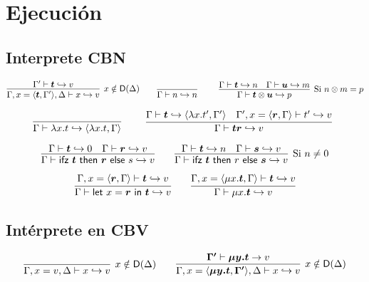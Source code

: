 \documentclass[twoside,a4paper,12pt]{article}
\theoremstyle{definition}
\theoremstyle{remark}
\begin{document}
\newpage
\section*{Ejecución}

\subsection*{Interprete CBN}

\begin{equation*}
  \infer[x\notin\mathsf D(\Delta)]
    {\Gamma,x=\thunk {\bm{t}}{\Gamma'},\Delta\vdash x\hra v}
    {\Gamma'\vdash \bm{t}\hra v}
  \qquad
  \infer[]
    {\Gamma\vdash n\hra n}
    {}
  \qquad
  \infer[\textrm{Si }n\otimes m=p]
    {\Gamma\vdash \bm{t} \otimes \bm{u} \hra p}
    {\Gamma\vdash \bm{t} \hra n & \Gamma\vdash \bm{u}\hra m }
\end{equation*}

\begin{equation*}
  \infer[]
    {\Gamma\vdash\fun xt\hra\thunk {\fun xt}\Gamma}
    {}
  \qquad
  \infer[]
    {\Gamma\vdash \bm{t} \bm{r} \hra v}
    {
      \Gamma\vdash \bm{t} \hra \thunk{\fun x{t'}}{\Gamma'}
      & \Gamma',x=\thunk{\bm{r}}{\Gamma} \vdash t'\hra v
    }
\end{equation*}

\begin{equation*}
  \infer
    {\Gamma\vdash \ifz {\bm t}{\bm r}{s} \hra v}
    {\Gamma\vdash \bm t \hra 0 & \Gamma \vdash \bm r \hra v}
  \qquad
  \infer[\textrm{Si }n\neq 0]
    {\Gamma\vdash \ifz {\bm t}{r}{\bm s} \hra v}
    {\Gamma\vdash \bm t \hra n & \Gamma\vdash \bm s \hra v}
\end{equation*}

\begin{equation*}
  \infer
    {\Gamma \vdash \letl {x}{\bm r}{\bm t} \hra v}
    {\Gamma,x=\thunk{\bm r}{\Gamma} \vdash \bm t \hra v}
  \qquad
    \infer{\Gamma\vdash\fix{x}{\bm t} \hra v}
    {\Gamma,x=\thunk{\fix{x}{\bm t}}\Gamma\vdash \bm t \hra v}
\end{equation*}

\subsection*{Intérprete en CBV}

\begin{equation*}
  \infer[x\notin\mathsf D(\Delta)]
    {\Gamma,x=v,\Delta\vdash x\hra v}
    {}
  \qquad
  \infer[x\notin\mathsf D(\Delta)]
    {\Gamma,x=\thunk{\bm{\fix yt}}{\bm{\Gamma'}},\Delta\vdash x\hra v}
    {\bm{\Gamma'} \vdash \bm{\fix yt} \to v}
\end{equation*}
\end{document}
